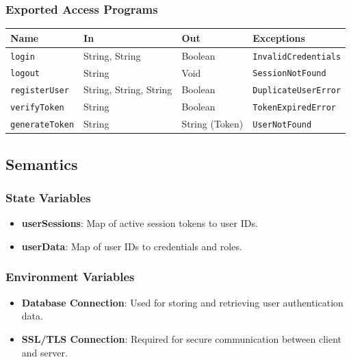 \documentclass[12pt, titlepage]{article}
\begin{document}
\subsubsection{Exported Access Programs}

\begin{center}
  \begin{tabular}{|p{3cm} | p{4cm} | p{4cm} | p{4cm}|}
    \hline
    \textbf{Name}          & \textbf{In}            & \textbf{Out}   & \textbf{Exceptions}         \\
    \hline
    \texttt{login}         & String, String         & Boolean        & \texttt{InvalidCredentials} \\
    \texttt{logout}        & String                 & Void           & \texttt{SessionNotFound}    \\
    \texttt{registerUser}  & String, String, String & Boolean        & \texttt{DuplicateUserError} \\
    \texttt{verifyToken}   & String                 & Boolean        & \texttt{TokenExpiredError}  \\
    \texttt{generateToken} & String                 & String (Token) & \texttt{UserNotFound}       \\
    \hline
  \end{tabular}
\end{center}

\subsection{Semantics}

\subsubsection{State Variables}

\begin{itemize}
  \item \textbf{userSessions}: Map of active session tokens to user IDs.
  \item \textbf{userData}: Map of user IDs to credentials and roles.
\end{itemize}

\subsubsection{Environment Variables}

\begin{itemize}
  \item \textbf{Database Connection}: Used for storing and retrieving user authentication data.
  \item \textbf{SSL/TLS Connection}: Required for secure communication between client and server.
\end{itemize}
\end{document}
